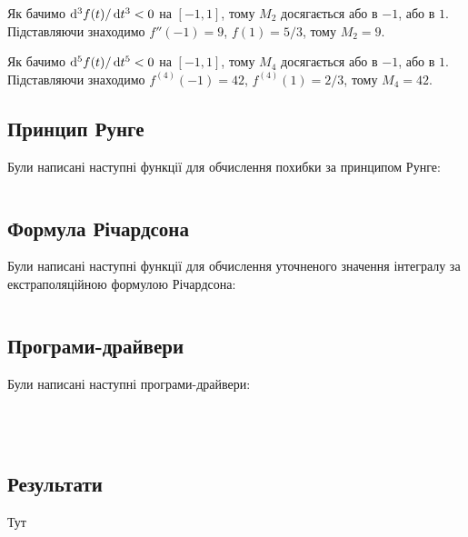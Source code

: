 Як бачимо $\mathop{}\!\mathrm{d}^3 f(t) / \mathop{}\!\mathrm{d} t^3 < 0$ на $[-1,1]$, тому $M_2$ досягається або в $-1$, або в $1$. Підставляючи знаходимо $f''(-1) = 9$, $f(1) = 5 / 3$, тому $M_2 = 9$. \medskip

Як бачимо $\mathop{}\!\mathrm{d}^5 f(t) / \mathop{}\!\mathrm{d} t^5 < 0$ на $[-1,1]$, тому $M_4$ досягається або в $-1$, або в $1$. Підставляючи знаходимо $f^{(4)}(-1) = 42$, $f^{(4)}(1) = 2 / 3$, тому $M_4 = 42$.

\subsection{Принцип Рунге}

Були написані наступні функції для обчислення похибки за принципом Рунге:

\inputminted[firstline=7]{python}{../py/runge.py}

\subsection{Формула Річардсона}

Були написані наступні функції для обчислення уточненого значення інтегралу за екстраполяційною формулою Річардсона:

\inputminted[firstline=7]{python}{../py/richardson.py}

\subsection{Програми-драйвери}

Були написані наступні програми-драйвери:

\inputminted[firstline=10, lastline=18]{python}{../py/main.py}
\inputminted[firstline=35, lastline=43]{python}{../py/main.py}
\inputminted[firstline=60, lastline=68]{python}{../py/main.py}
\inputminted[firstline=85]{python}{../py/main.py}

\subsection{Результати}

Тут 

